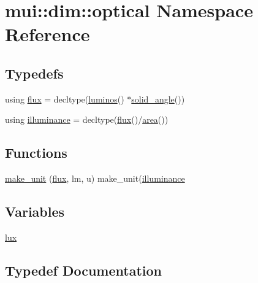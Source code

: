 \hypertarget{namespacemui_1_1dim_1_1optical}{}\section{mui\+:\+:dim\+:\+:optical Namespace Reference}
\label{namespacemui_1_1dim_1_1optical}
\subsection*{Typedefs}
\begin{DoxyCompactItemize}
\item 
using \hyperlink{namespacemui_1_1dim_1_1optical_a59b742e45cdd92e3759a0242d3d0b143}{flux} = decltype(\hyperlink{namespacemui_1_1dim_aaa6d47b51b672a8e7b7c549d6a437977}{luminos}() $\ast$\hyperlink{namespacemui_1_1dim_a27f33f962d17ae1ee0c08c7ae835d7b8}{solid\+\_\+angle}())
\item 
using \hyperlink{namespacemui_1_1dim_1_1optical_a12f550275cec80470e7b6354ef378c32}{illuminance} = decltype(\hyperlink{namespacemui_1_1dim_1_1optical_a59b742e45cdd92e3759a0242d3d0b143}{flux}()/\hyperlink{namespacemui_1_1dim_aedf0a30e04c732a032fe7e04d3260ee3}{area}())
\end{DoxyCompactItemize}
\subsection*{Functions}
\begin{DoxyCompactItemize}
\item 
\hyperlink{namespacemui_1_1dim_1_1optical_a949983f04a3c9e732ede62827b7cc607}{make\+\_\+unit} (\hyperlink{namespacemui_1_1dim_1_1optical_a59b742e45cdd92e3759a0242d3d0b143}{flux}, lm, u) make\+\_\+unit(\hyperlink{namespacemui_1_1dim_1_1optical_a12f550275cec80470e7b6354ef378c32}{illuminance}
\end{DoxyCompactItemize}
\subsection*{Variables}
\begin{DoxyCompactItemize}
\item 
\hyperlink{namespacemui_1_1dim_1_1optical_a7b89cb4b8601c91ea5ad5dd2832b48b4}{lux}
\end{DoxyCompactItemize}


\subsection{Typedef Documentation}
\mbox{\label{namespacemui_1_1dim_1_1optical_a59b742e45cdd92e3759a0242d3d0b143}} 
